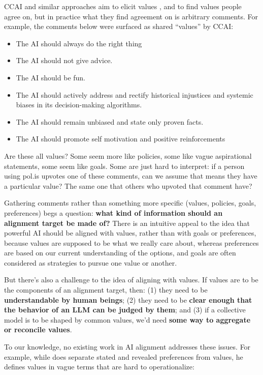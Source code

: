 \documentclass{article}
\theoremstyle{definition}
\begin{document}
CCAI and similar approaches aim to elicit values \citep{anthropic2023collective}, and to find values people agree on, but in practice what they find agreement on is arbitrary comments. For example, the comments below were surfaced as shared “values” by CCAI:

    \begin{itemize}
             \item The AI should always do the right thing
\item The AI should not give advice.
\item The AI should be fun.
\item The AI should actively address and rectify historical injustices and systemic biases in its decision-making algorithms.
\item The AI should remain unbiased and state only proven facts.
\item The AI should promote self motivation and positive reinforcements
    \end{itemize}

Are these all values? Some seem more like policies, some like vague aspirational statements, some seem like goals. Some are just hard to interpret: if a person using pol.is upvotes one of these comments, can we assume that means they have a particular value? The same one that others who upvoted that comment have?

Gathering comments rather than something more specific (values, policies, goals, preferences) begs a question: \textbf{what kind of information should an alignment target be made of?} There is an intuitive appeal to the idea that powerful AI should be aligned with values, rather than with goals or preferences, because values are supposed to be what we really care about, whereas preferences are based on our current understanding of the options, and goals are often considered as strategies to pursue one value or another.

But there's also a challenge to the idea of aligning with values. If values are to be the components of an alignment target, then: (1) they need to be \textbf{understandable by human beings}; (2) they need to be \textbf{clear enough that the behavior of an LLM can be judged by them}; and (3) if a collective model is to be shaped by common values, we'd need \textbf{some way to aggregate or reconcile values}.

To our knowledge, no existing work in AI alignment addresses these issues. For example, while \cite{Gabriel:2020} does separate stated and revealed preferences from values, he defines values in vague terms that are hard to operationalize: 
\end{document}
